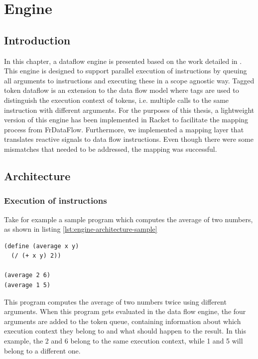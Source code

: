 \chapter{Engine}

\section{Introduction}

In this chapter, a dataflow engine is presented based on the work detailed in \citet{saey_extensible_2017}.
This engine is designed to support parallel execution of instructions by queuing all arguments to instructions and executing these in a scope agnostic way.
Tagged token dataflow is an extension to the data flow model where tags are used to distinguish the execution context of tokens, i.e. multiple calls to the same instruction with different arguments.
For the purposes of this thesis, a lightweight version of this engine has been implemented in Racket to facilitate the mapping process from FrDataFlow. Furthermore, we implemented a mapping layer that translates reactive signals to data flow instructions. Even though there were some mismatches that needed to be addressed, the mapping was successful. 

\newpage
\section{Architecture}

\subsection{Execution of instructions}

Take for example a sample program which computes the average of two numbers, as shown in listing \ref{lst:engine-architecture-sample}

\begin{lstlisting}[caption={Computing the average of two numbers},captionpos=b,label={lst:engine-architecture-sample}]
(define (average x y)
  (/ (+ x y) 2))
  
(average 2 6)
(average 1 5)
\end{lstlisting}

This program computes the average of two numbers twice using different arguments. When this program gets evaluated in the data flow engine, the four arguments are added to the token queue, containing information about which execution context they belong to and what should happen to the result. 
In this example, the 2 and 6 belong to the same execution context, while 1 and 5 will belong to a different one. 

